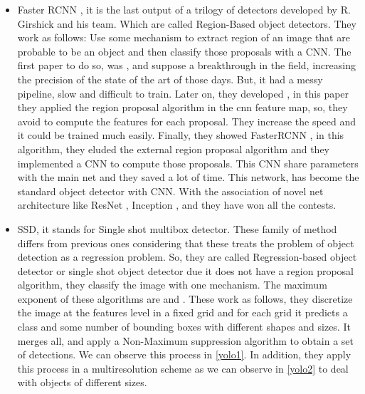 \begin{itemize}

\item Faster RCNN \cite{fasterrcnn}, it is the last output of a trilogy of detectors developed by R. Girshick and his team. Which are called Region-Based object detectors. They work as follows: Use some mechanism to extract region of an image that are probable to be an object and then classify those proposals with a CNN. The first paper to do so, was \cite{rcnn}, and suppose a breakthrough in the field, increasing the precision of the state of the art of those days. But, it had a messy pipeline, slow and difficult to train. Later on, they developed \cite{fastrcnn}, in this paper they applied the region proposal algorithm in the cnn feature map, so, they avoid to compute the features for each proposal. They increase the speed and it could be trained much easily. Finally, they showed FasterRCNN \cite{fasterrcnn}, in this algorithm, they eluded the external region proposal algorithm and they implemented a CNN to compute those proposals. This CNN share parameters with the main net and they saved a lot of time. This network, has become the standard object detector with CNN. With the association of novel net architecture like ResNet \cite{resnet}, Inception \cite{inception}, and \cite{pvanet} they have won all the contests.


\item SSD, it stands for Single shot multibox detector. These family of method differs from previous ones considering that these treats the problem of object detection as a regression problem. So, they are called Regression-based object detector or single shot object detector due it does not have a region proposal algorithm, they classify the image with one mechanism. The maximum exponent of these algorithms are \cite{yolo} and \cite{ssd}. These work as follows, they discretize the image at the features level in a fixed grid and for each grid it predicts a class and some number of bounding boxes with different shapes and sizes. It merges all, and apply a Non-Maximum suppression algorithm to obtain a set of detections. We can observe this process in \ref{yolo1}. In addition, they apply this process in a multiresolution scheme as we can observe in \ref{yolo2} to deal with objects of different sizes.

\begin{figure}[H]
		
\centering


\end{figure}
\end{itemize}
